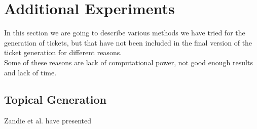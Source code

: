 \section{Additional Experiments}

In this section we are going to describe various methods we have tried for the generation of tickets, but that have not been included in the final version of the ticket generation for different reasons. \\
Some of these reasons are lack of computational power, not good enough results and lack of time. \\

\subsection{Topical Generation}
Zandie et al. have presented 